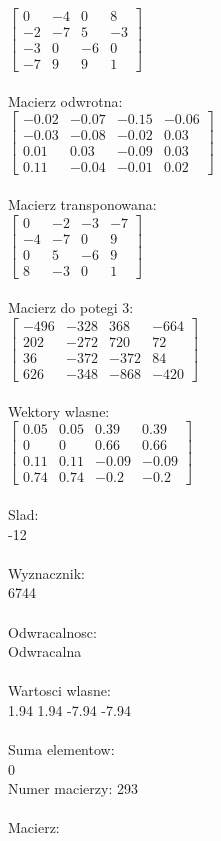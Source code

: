 \documentclass[a4paper,12pt]{article}
\begin{document}
$\begin{bmatrix} 0&-4&0&8\\-2&-7&5&-3\\-3&0&-6&0\\-7&9&9&1 \end{bmatrix}$
\\
\\
Macierz odwrotna:\\

$\begin{bmatrix} -0.02&-0.07&-0.15&-0.06\\-0.03&-0.08&-0.02&0.03\\0.01&0.03&-0.09&0.03\\0.11&-0.04&-0.01&0.02 \end{bmatrix}$
\\
\\
Macierz transponowana:\\

$\begin{bmatrix} 0&-2&-3&-7\\-4&-7&0&9\\0&5&-6&9\\8&-3&0&1 \end{bmatrix}$
\\
\\
Macierz do potegi 3:\\

$\begin{bmatrix} -496&-328&368&-664\\202&-272&720&72\\36&-372&-372&84\\626&-348&-868&-420 \end{bmatrix}$
\\
\\
Wektory wlasne:\\

$\begin{bmatrix} 0.05&0.05&0.39&0.39\\0&0&0.66&0.66\\0.11&0.11&-0.09&-0.09\\0.74&0.74&-0.2&-0.2 \end{bmatrix}$
\\
\\
Slad:\\
-12
\\
\\
Wyznacznik:\\
6744
\\
\\
Odwracalnosc:\\
Odwracalna
\\
\\
Wartosci wlasne:\\
1.94 1.94 -7.94 -7.94
\\
\\
Suma elementow:\\
0
\\
\newpage
Numer macierzy:
293
\\
\\
Macierz:\\
\end{document}
